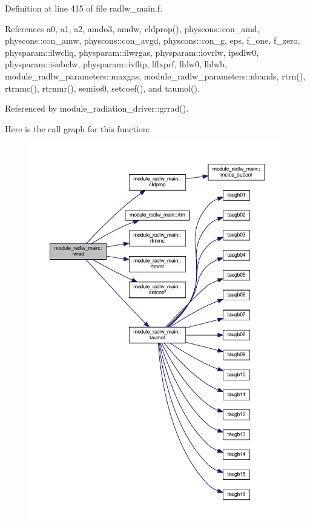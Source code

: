 Definition at line 415 of file radlw\+\_\+main.\+f.



References a0, a1, a2, amdo3, amdw, cldprop(), physcons\+::con\+\_\+amd, physcons\+::con\+\_\+amw, physcons\+::con\+\_\+avgd, physcons\+::con\+\_\+g, eps, f\+\_\+one, f\+\_\+zero, physparam\+::ilwcliq, physparam\+::ilwrgas, physparam\+::iovrlw, ipsdlw0, physparam\+::isubclw, physparam\+::ivflip, lflxprf, lhlw0, lhlwb, module\+\_\+radlw\+\_\+parameters\+::maxgas, module\+\_\+radlw\+\_\+parameters\+::nbands, rtrn(), rtrnmc(), rtrnmr(), semiss0, setcoef(), and taumol().



Referenced by module\+\_\+radiation\+\_\+driver\+::grrad().



Here is the call graph for this function\+:\nopagebreak
\begin{figure}[H]
\begin{center}
\leavevmode
\includegraphics[width=350pt]{namespacemodule__radlw__main_a072a355f2067d729d64d2997270e36b1_cgraph}
\end{center}
\end{figure}




